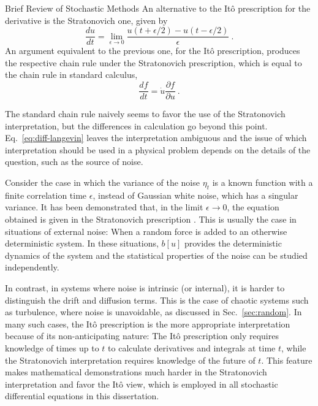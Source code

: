 \begin{chapter}{Brief Review of Stochastic Methods}
An alternative to the Itô prescription for the derivative is
the Stratonovich one, given by
\begin{equation}
\frac{du}{dt} = \lim_{\epsilon \to 0} \frac{u(t+\epsilon/2) - u(t-\epsilon/2)}{\epsilon} \ .
\end{equation}
An argument equivalent to the previous one, for the Itô prescription,
produces the respective chain rule under the Stratonovich prescription,
which is equal to the chain rule in standard calculus,
\begin{equation}
    \frac{df}{dt} = \dot u \frac{\partial f}{\partial u} \ .
\end{equation}


The standard chain rule naively seems to favor the use
of the Stratonovich interpretation, but the differences in
calculation go beyond this point.
Eq.~\eqref{eq:diff-langevin} leaves the interpretation ambiguous
and the issue of which interpretation should be used in a physical
problem depends on the details of the question, such as the source of noise.

Consider the case in which
the variance of the noise $\eta_t$ is a known function with a finite
correlation time $\epsilon$,
instead of Gaussian white noise, which has a singular variance.
It has been demonstrated that, in the limit $\epsilon \to 0$, the equation obtained
is given in the Stratonovich prescription \parencite{mori1975}.
This is usually the case in situations of external noise: When
a random force is added to an otherwise deterministic system.
In these situations, $b[u]$ provides the deterministic
dynamics of the system and the statistical properties of the noise can be studied
independently.

In contrast, in systems where noise is intrinsic (or internal),
it is harder to distinguish the drift and diffusion terms.
This is the case of chaotic systems such as turbulence, where noise
is unavoidable, as discussed in Sec.~\ref{sec:random}.
In many such cases, the Itô prescription is the more appropriate
interpretation because of its non-anticipating nature:
The Itô prescription only requires knowledge of times up to $t$
to calculate derivatives and integrals at time $t$, while the Stratonovich interpretation
requires knowledge of the future of $t$.
This feature makes mathematical demonstrations much harder
in the Stratonovich interpretation and favor the Itô view,
which is employed in all stochastic differential equations
in this dissertation.


\end{chapter}
